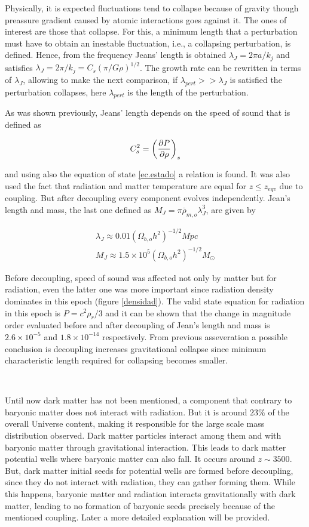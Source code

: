Physically, it is expected fluctuations tend to collapse 
because of gravity though preassure gradient caused by atomic
interactions goes against it. The ones of interest are those
that collapse. For this, a minimum length that a perturbation
must have to obtain an inestable fluctuation, i.e., a collapsing
perturbation, is defined. Hence, from the frequency Jeans' length
is obtained $\lambda_J = 2\pi a/k_j$ and satisfies 
$\lambda_J = 2\pi/k_j = C_s(\pi/G\rho)^{1/2}$.
The growth rate can be rewritten in terms of $\lambda_J$, 
allowing to make the next comparison, if $\lambda_{pert}>>\lambda_J$
is satisfied the perturbation collapses, here $\lambda_{pert}$
is the length of the perturbation.

As was shown previously, Jeans' length depends on the speed of sound
that is defined as 

\[
C_s^2 = \left( \frac{\partial P}{\partial \rho} \right)_s
\]

and using also the equation of state \ref{ec.estado} a relation 
is found. It was also used the fact that radiation and matter 
temperature are equal for $z \leq z_{eqv}$ due to coupling. 
But after decoupling every component evolves independently. 
Jean's length and mass, the last one defined as $M_J =  \pi\overline{\rho}_{m,o}\lambda_J^3 $,
are given by

\begin{eqnarray}
\lambda_J \approx 0.01(\Omega_{b,o}h^2)^{-1/2}Mpc\\
M_J \approx 1.5\times 10^5 (\Omega_{b,o}h^2)^{-1/2}M_{\odot}
\end{eqnarray}

Before decoupling, speed of sound was affected not only 
by matter but for radiation, even the latter one was more
important since radiation density dominates in this epoch
(figure \ref{densidad}). 
The valid state equation for radiation in this epoch is
$P = c^2\rho_r/3$ and it can be shown that the change 
in magnitude order evaluated before and after decoupling
of Jean's length and mass is $2.6\times 10^{-5}$ and $1.8\times 10^{-14}$
respectively. From previous asseveration a possible conclusion is
decoupling increases gravitational collapse since  minimum characteristic length
required for collapsing becomes smaller. 

\

Until now dark matter has not been mentioned, a component that contrary
to baryonic matter does not interact with radiation. But it is around
$23\%$ of the overall Universe content, making it responsible for the 
large scale mass distribution observed. Dark matter particles interact
among them and with baryonic matter through gravitational interaction.
This leads to dark matter potential wells where baryonic matter can also fall.  
It occurs around $z \sim 3500$. But, dark matter initial seeds for potential 
wells are formed before decoupling, since they do not interact with radiation,
they can gather forming them. While this happens, baryonic matter and radiation 
interacts gravitationally with dark matter, leading to no formation of 
baryonic seeds precisely because of the mentioned coupling. Later a more detailed 
explanation will be provided. 

